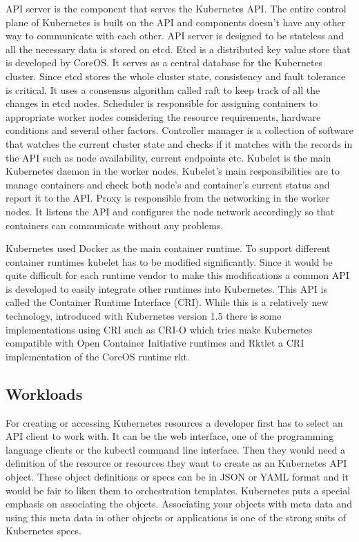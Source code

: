 \documentclass[12pt,oneandhalf,chaparabic,ceng,ms,eng,oneside,pntc]{gsufbe}
\begin{document}
API server is the component that serves the Kubernetes API. The entire control plane of Kubernetes is
built on the API and components doesn't have any other way to communicate with each other. API server
is designed to be stateless and all the necessary data is stored on etcd.
Etcd is a distributed key value store that is developed by CoreOS. It serves as a central database for
the Kubernetes cluster. Since etcd stores the whole cluster state, consistency and fault tolerance is
critical. It uses a consensus algorithm called raft to keep track of all the changes in etcd nodes.
Scheduler is responsible for assigning containers to appropriate worker nodes considering the resource
requirements, hardware conditions and several other factors.
Controller manager is a collection of software that watches the current cluster state and checks if it
matches with the records in the API such as node availability, current endpoints etc.
Kubelet is the main Kubernetes daemon in the worker nodes. Kubelet's main responsibilities are to 
manage containers and check both node's and container's current status and report it to the API.
Proxy is responsible from the networking in the worker nodes. It listens the API and configures the
node network accordingly so that containers can communicate without any problems.

Kubernetes used Docker as the main container runtime. To support different container runtimes kubelet
has to be modified significantly. Since it would be quite difficult for each runtime vendor to make
this modifications a common API is developed to easily integrate other runtimes into Kubernetes. This
API is called the Container Runtime Interface (CRI). While this is a relatively new technology,
introduced with Kubernetes version 1.5 there is some implementations using CRI such as CRI-O which
tries make Kubernetes compatible with Open Container Initiative runtimes and Rktlet a CRI
implementation of the CoreOS runtime rkt.

\subsection{Workloads}
For creating or accessing Kubernetes resources a developer first has to select an API client to work
with. It can be the web interface, one of the programming language clients or the kubectl command line
interface. Then they would need a definition of the resource or resources they want to create as an
Kubernetes API object. These object definitions or specs can be in JSON or YAML format and it would be
fair to liken them to orchestration templates. Kubernetes puts a special emphasis on associating the
objects. Associating your objects with meta data and using this meta data in other objects or
applications is one of the strong suits of Kubernetes specs.
\end{document}
